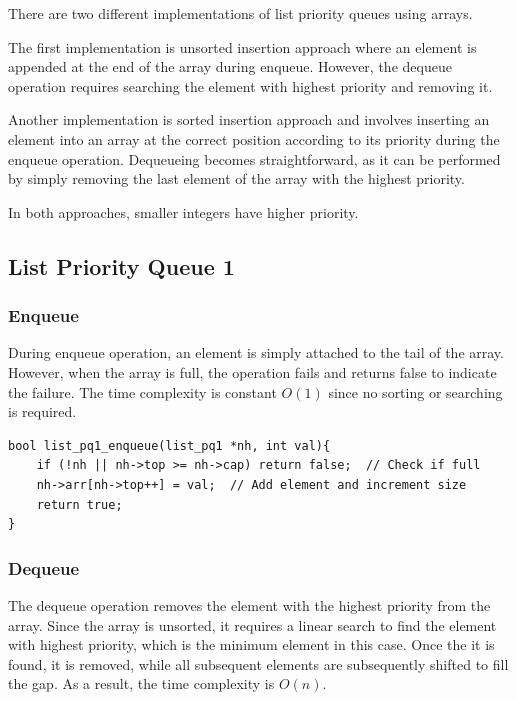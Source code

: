 \documentclass[a4paper,11pt]{article}
\begin{document}
There are two different implementations of list priority queues using arrays.

The first implementation is unsorted insertion approach where an element is appended at the end of the array during enqueue. However, the dequeue operation requires searching the element with highest priority and removing it.

Another implementation is sorted insertion approach and involves inserting an element into an array at the correct position according to its priority during the enqueue operation. Dequeueing becomes straightforward, as it can be performed by simply removing the last element of the array with the highest priority.

In both approaches, smaller integers have higher priority.

\subsection*{List Priority Queue 1}
\subsubsection*{Enqueue}

During enqueue operation, an element is simply attached to the tail of the array. However, when the array is full, the operation fails and returns false to indicate the failure. The time complexity is constant $O(1)$ since no sorting or searching is required.

\begin{verbatim}
bool list_pq1_enqueue(list_pq1 *nh, int val){
    if (!nh || nh->top >= nh->cap) return false;  // Check if full
    nh->arr[nh->top++] = val;  // Add element and increment size
    return true;
}
\end{verbatim}

\subsubsection*{Dequeue}
The dequeue operation removes the element with the highest priority from the array. Since the array is unsorted, it requires a linear search to find the element with highest priority, which is the minimum element in this case. Once the it is found, it is removed, while all subsequent elements are subsequently shifted to fill the gap. As a result, the time complexity is $O(n)$.
\end{document}
